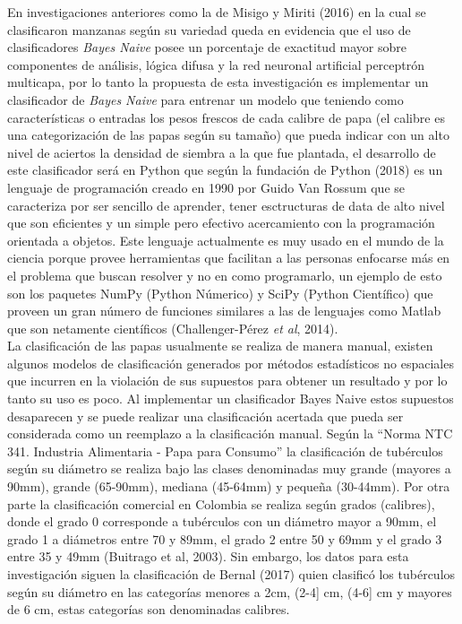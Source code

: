 En investigaciones anteriores como la de Misigo y Miriti (2016) en la cual se clasificaron manzanas según su variedad queda en evidencia que el uso de clasificadores \textit{Bayes Naive} posee un porcentaje de exactitud mayor sobre componentes de análisis, lógica difusa y la red neuronal artificial perceptrón multicapa, por lo tanto la propuesta de esta investigación es implementar un clasificador de \textit{Bayes Naive} para entrenar un modelo que teniendo como características o entradas los pesos frescos de cada calibre de papa (el calibre es una categorización de las papas según su tamaño) que pueda indicar con un alto nivel de aciertos la densidad de siembra a la que fue plantada, el desarrollo de este clasificador será en Python que según la fundación de Python (2018) es un lenguaje de programación creado en 1990 por Guido Van Rossum que se caracteriza por ser sencillo de aprender, tener esctructuras de data de alto nivel que son eficientes y un simple pero efectivo acercamiento con la programación orientada a objetos. Este lenguaje actualmente es muy usado en el mundo de la ciencia porque provee herramientas que facilitan a las personas enfocarse más en el problema que buscan resolver y no en como programarlo, un ejemplo de esto son los paquetes NumPy (Python Númerico) y SciPy (Python Científico) que proveen un gran número de funciones similares a las de lenguajes como Matlab que son netamente científicos (Challenger-Pérez \textit{et al}, 2014).\\

La clasificación de las papas usualmente se realiza de manera manual, existen algunos modelos de clasificación generados por métodos estadísticos no espaciales que incurren en la violación de sus supuestos para obtener un resultado y por lo tanto su uso es poco. Al implementar un clasificador Bayes Naive estos supuestos desaparecen y se puede realizar una clasificación acertada que pueda ser considerada como un reemplazo a la clasificación manual. Según la "`Norma NTC 341. Industria Alimentaria - Papa para Consumo"' la clasificación de tubérculos según su diámetro se realiza bajo las clases denominadas muy grande (mayores a 90mm), grande (65-90mm), mediana (45-64mm) y pequeña (30-44mm). Por otra parte la clasificación comercial en Colombia se realiza según grados (calibres), donde el grado 0 corresponde a tubérculos con un diámetro mayor a 90mm, el grado 1 a diámetros entre 70 y 89mm, el grado 2 entre 50 y 69mm y el grado 3 entre 35 y 49mm (Buitrago et al, 2003). Sin embargo, los datos para esta investigación siguen la clasificación de Bernal (2017) quien clasificó los tubérculos según su diámetro en las categorías menores a 2cm, (2-4] cm, (4-6] cm y mayores de 6 cm, estas categorías son denominadas calibres.\\

